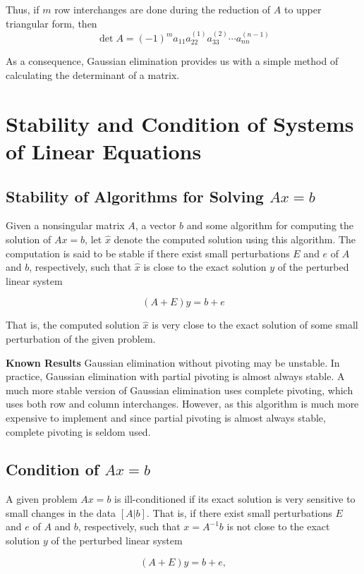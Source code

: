 \documentclass [titlepage,12pt,letter] {article}
\begin{document}
Thus, if $m$ row interchanges are done during the reduction of $A$ to upper triangular form, then
\[ \det A = (-1)^m a_{11}a_{22}^{(1)}a_{33}^{(2)} \dotsm a_{nn}^{(n-1)} \]

As a consequence, Gaussian elimination provides us with a simple method of calculating the determinant of a matrix.

\section{Stability and Condition of Systems of Linear Equations}

\subsection{Stability of Algorithms for Solving $Ax=b$}

Given a nonsingular matrix $A$, a vector $b$ and some algorithm for computing the solution of $Ax=b$,  let $\hat{x}$  
denote the computed solution using this algorithm. The computation is said to be stable if there exist small perturbations $E$ and $e$ of $A$ and $b$, respectively, such that $\hat{x}$
 is close to the exact solution $y$ of the perturbed linear system

\[ (A+E)y=b+e \]

That is, the computed solution $\hat{x}$ is very close to the exact solution of some small perturbation of the given problem.


{\bf Known Results}
Gaussian elimination without pivoting may be unstable. In practice, Gaussian elimination with partial pivoting is almost always stable. A much more stable version of Gaussian elimination uses complete pivoting, which uses both row and column interchanges. However, as this algorithm is much more expensive to implement and since partial pivoting is almost always stable, complete pivoting is seldom used.


\subsection{Condition of $Ax=b$}


A given problem $Ax=b$ is ill-conditioned if its exact solution is very sensitive to small changes in the data $[A | b]$. That is, if there exist small perturbations $E$ and $e$ of $A$ and $b$, respectively, such that $x=A^{-1}b$
 is not close to the exact solution $y$ of the perturbed linear system

\[ (A+E)y=b+e, \]
\end{document}
